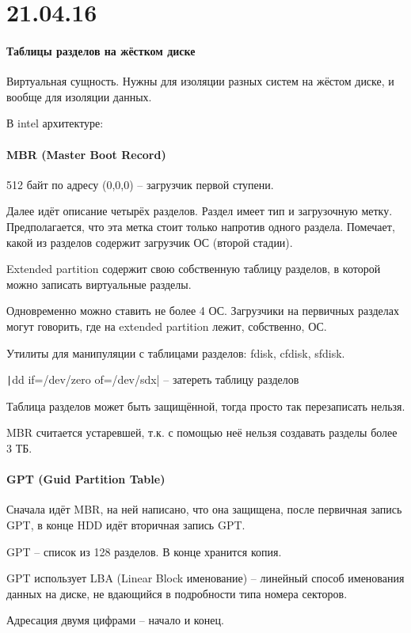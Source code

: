 \documentclass[a4paper,10pt]{article}
\begin{document}
\section{21.04.16}
\paragraph{Таблицы разделов на жёстком диске}
Виртуальная сущность. Нужны для изоляции разных систем на жёстом диске, и вообще для изоляции данных.

В intel архитектуре:

\paragraph{MBR (Master Boot Record)}
512 байт по адресу (0,0,0)  -- загрузчик первой ступени.

Далее идёт описание четырёх разделов. Раздел имеет тип и загрузочную метку. Предполагается, что эта метка стоит только напротив одного раздела. Помечает, какой из разделов содержит загрузчик ОС (второй стадии).

Extended partition содержит свою собственную таблицу разделов, в которой можно записать виртуальные разделы.

Одновременно можно ставить не более 4 ОС. Загрузчики на первичных разделах могут говорить, где на extended partition лежит, собственно, ОС.

Утилиты для манипуляции с таблицами разделов: fdisk, cfdisk, sfdisk.

\texttt|dd if=/dev/zero of=/dev/sdx|  -- затереть таблицу разделов

Таблица разделов может быть защищённой, тогда просто так перезаписать нельзя.

MBR считается устаревшей, т.к. с помощью неё нельзя создавать разделы более 3 ТБ.

\paragraph{GPT (Guid Partition Table)}
Сначала идёт MBR, на ней написано, что она защищена, после первичная запись GPT, в конце HDD идёт вторичная запись GPT.

GPT -- список из 128 разделов. В конце хранится копия.

GPT использует LBA (Linear Block именование) -- линейный способ именования данных на диске, не вдающийся в подробности типа номера секторов.

Адресация двумя цифрами -- начало и конец.
\end{document}
